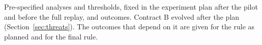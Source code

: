 \begin{table}[tbp]
  \caption{Pre-specified analyses and thresholds, fixed in the experiment plan after the pilot and before the full
  replay, and outcomes. Contract B evolved after the plan (Section~\ref{sec:threats}). The outcomes that depend on it
  are given for the rule as planned and for the final rule.}
  \label{tab:prereg}
  \small
  
\end{table}
